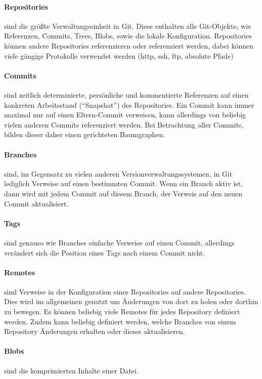 \paragraph{Repositories} sind die größte Verwaltungseinheit in Git. Diese enthalten alle Git-Objekte, wie Referenzen, Commits, Trees, Blobs, sowie die lokale Konfiguration. Repositories können andere Repositories referenzieren oder referenziert werden, dabei können viele gängige Protokolle verwendet werden (http, ssh, ftp, absolute Pfade)

\paragraph{Commits} sind zeitlich determinierte, persönliche und kommentierte Referenzen auf einen konkreten Arbeitsstand (``Snapshot'') des Repositories. Ein Commit kann immer maximal nur auf einen Eltern-Commit verweisen, kann allerdings von beliebig vielen anderen Commits referenziert werden. Bei Betrachtung aller Commits, bilden dieser daher einen gerichteten Baumgraphen.

\paragraph{Branches} sind, im Gegensatz zu vielen anderen Versionverwaltungssystemen, in Git lediglich Verweise auf einen bestimmten Commit. Wenn ein Branch aktiv ist, dann wird mit jedem Commit auf diesem Branch, der Verweis auf den neuen Commit aktualisiert.

\paragraph{Tags} sind genauso wie Branches einfache Verweise auf einen Commit, allerdings verändert sich die Position eines Tags nach einem Commit nicht.

\paragraph{Remotes} sind Verweise in der Konfiguration eines Repositories auf andere Repositories. Dies wird im allgemeinen genutzt um Änderungen von dort zu holen oder dorthin zu bewegen. Es können beliebig viele Remotes für jedes Repository definiert werden. Zudem kann beliebig definiert werden, welche Branches von einem Repository Änderungen erhalten oder dieses aktualisieren.

\paragraph{Blobs} sind die komprimierten Inhalte einer Datei.

